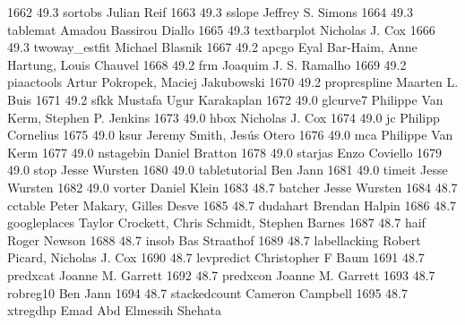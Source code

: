   1662     49.3    sortobs       Julian Reif                             
  1663     49.3    sslope        Jeffrey S. Simons                       
  1664     49.3    tablemat      Amadou Bassirou Diallo                  
  1665     49.3    textbarplot   Nicholas J. Cox                         
  1666     49.3    twoway_estfit  Michael Blasnik                         
  1667     49.2    apcgo         Eyal Bar-Haim, Anne Hartung, Louis      
                                   Chauvel                                 
  1668     49.2    frm           Joaquim J. S. Ramalho                   
  1669     49.2    piaactools    Artur Pokropek, Maciej Jakubowski       
  1670     49.2    proprcspline  Maarten L. Buis                         
  1671     49.2    sfkk          Mustafa Ugur Karakaplan                 
  1672     49.0    glcurve7      Philippe Van Kerm, Stephen P. Jenkins   
  1673     49.0    hbox          Nicholas J. Cox                         
  1674     49.0    jc            Philipp Cornelius                       
  1675     49.0    ksur          Jeremy Smith, Jesús Otero              
  1676     49.0    mca           Philippe Van Kerm                       
  1677     49.0    nstagebin     Daniel Bratton                          
  1678     49.0    starjas       Enzo Coviello                           
  1679     49.0    stop          Jesse Wursten                           
  1680     49.0    tabletutorial  Ben Jann                                
  1681     49.0    timeit        Jesse Wursten                           
  1682     49.0    vorter        Daniel Klein                            
  1683     48.7    batcher       Jesse Wursten                           
  1684     48.7    cctable       Peter Makary, Gilles Desve              
  1685     48.7    dudahart      Brendan Halpin                          
  1686     48.7    googleplaces  Taylor Crockett, Chris Schmidt, Stephen 
                                   Barnes                                  
  1687     48.7    haif          Roger Newson                            
  1688     48.7    insob         Bas Straathof                           
  1689     48.7    labellacking  Robert Picard, Nicholas J. Cox          
  1690     48.7    levpredict    Christopher F Baum                      
  1691     48.7    predxcat      Joanne M. Garrett                       
  1692     48.7    predxcon      Joanne M. Garrett                       
  1693     48.7    robreg10      Ben Jann                                
  1694     48.7    stackedcount  Cameron Campbell                        
  1695     48.7    xtregdhp      Emad Abd Elmessih Shehata               
